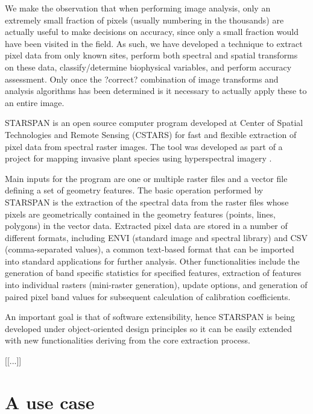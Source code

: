 \documentclass{elsart}
\begin{document}
We make the observation that when performing image analysis,
only an extremely small fraction of pixels (usually
numbering in the thousands) are actually useful to make
decisions on accuracy, since only a small fraction would
have been visited in the field. As such, we have developed a
technique to extract pixel data from only known sites,
perform both spectral and spatial transforms on these data,
classify/determine biophysical variables, and perform
accuracy assessment. Only once the ?correct? combination of
image transforms and analysis algorithms has been determined
is it necessary to actually apply these to an entire image.


STARSPAN is an open source computer program developed at
Center of Spatial Technologies and Remote Sensing (CSTARS)
for fast and flexible extraction of pixel data from spectral
raster images. The tool was developed as part of a project
for mapping invasive plant species using hyperspectral
imagery \citep{ustin04}.
	
Main inputs for the program are one or multiple raster files
and a vector file defining a set of geometry features. The
basic operation performed by STARSPAN is the extraction of
the spectral data from the raster files whose pixels are
geometrically contained in the geometry features (points,
lines, polygons) in the vector data. Extracted pixel data
are stored in a number of different formats, including ENVI
\citep{envi} (standard image and spectral library) and CSV
(comma-separated values), a common text-based format that
can be imported into standard applications for further
analysis. Other functionalities include the generation of
band specific statistics for specified features, extraction
of features into individual rasters (mini-raster
generation), update options, and generation of paired pixel
band values for subsequent calculation of calibration
coefficients.
	
An important goal is that of software extensibility, hence
STARSPAN is being developed under object-oriented design
principles so it can be easily extended with new
functionalities deriving from the core extraction process.

	[[...]]

\section{A use case}
\end{document}
